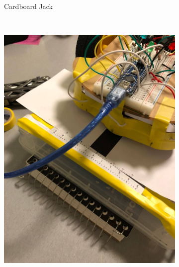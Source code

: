\documentclass[twocolumn]{article}
\begin{document}
\begin{flushleft}
		\begin{figure}[H]
			
			{\begin{subfigure}[t]{0.45\textwidth}
					\caption{Cardboard Jack}
					\label{fig:procedureRig}
				\end{subfigure}\\ \vspace{1em}%
				\begin{subfigure}[b]{0.45\textwidth}
					\includegraphics[width=1\columnwidth, keepaspectratio]{TestProcedure_Ruler.jpg}

\end{subfigure}}
\end{figure}
\end{flushleft}
\end{document}

